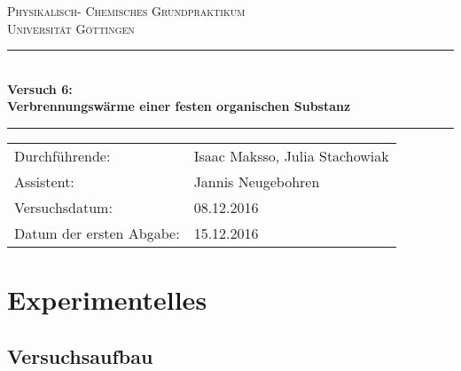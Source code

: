 \documentclass[12pt,a4paper,titlepage,headinclude,bibtotoc]{scrartcl}
\begin{document}
\begin{titlepage}
\centering
\textsc{\Large Physikalisch- Chemisches Grundpraktikum\\[1.5ex] Universität Göttingen}

\vspace*{0.5cm}

\rule{\textwidth}{1pt}\\[0.5cm]
{\huge \bfseries
  Versuch 6: \\[1.5ex]
  Verbrennungswärme einer festen organischen Substanz}\\[0.5cm]
\rule{\textwidth}{1pt}

\vspace*{0.5cm}


\begin{Large}
\begin{tabular}{ll}
Durchführende: &  Isaac Maksso, Julia Stachowiak\\
Assistent: & Jannis Neugebohren\\
Versuchsdatum: & 08.12.2016\\
Datum der ersten Abgabe: & 15.12.2016\\
\end{tabular}
\end{Large}

\vspace*{0.5cm}




\vspace{1.3cm} 
\end{titlepage}


\tableofcontents %

\section{Experimentelles}

\subsection{Versuchsaufbau}
\end{document}
